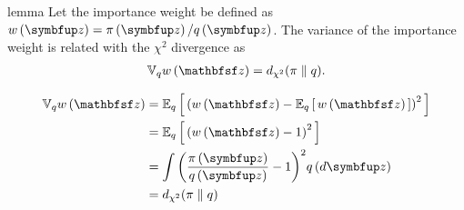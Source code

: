 
\begin{theoremEnd}{lemma}\label{thm:iw_variance}
  Let the importance weight be defined as \(w\left(\vz\right) = \pi\left(\vz\right)/q\left(\vz\right)\).
  The variance of the importance weight is related with the \(\chi^2\) divergence as
  \begin{align*}
    \mathbb{V}_{q}{w\left(\rvvz\right)}
    =
    \DChi{\pi}{q}.
  \end{align*}
\end{theoremEnd}
\begin{proofEnd}
  {
  \begin{alignat}{2}
    \mathbb{V}_{q}{w\left(\rvvz\right)}
    &=
    \Esub{q}{
      {\left(
        w\left(\rvvz\right)
      -
      \Esub{q}{
        w\left(\rvvz\right)
      }
      \right)}^2
    }
    \nonumber
    \\
    &=
    \Esub{q}{
      {\left(
      w\left(\rvvz\right)
      -
      1
      \right)}^2
    }
    \nonumber
    \\
    &=
    \int {\left( \frac{\pi\left(\vz\right)}{q\left(\vz\right)}  - 1 \right)}^2 q\left(d\vz\right)
    \nonumber
    \\
    &=
    \DChi{\pi}{q}
    \nonumber
  \end{alignat}
  }
\end{proofEnd}

